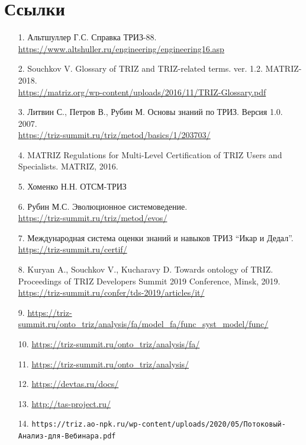 \documentclass[11pt,a4paper]{article}
\begin{document}
\section{Ссылки}
\begin{itemize}[leftmargin=18pt]
\item[1.] Альтшуллер Г.С. Справка ТРИЗ-88.\\
  \url{https://www.altshuller.ru/engineering/engineering16.asp}
\item[2.] Souchkov V. Glossary of TRIZ and TRIZ-related terms.  ver. 1.2.
  MATRIZ-2018.\\
  \url{https://matriz.org/wp-content/uploads/2016/11/TRIZ-Glossary.pdf}
\item[3.] Литвин С., Петров В., Рубин М. Основы знаний по ТРИЗ. Версия
  1.0. 2007.\\ \url{https://triz-summit.ru/triz/metod/basics/1/203703/}
\item[4.] MATRIZ Regulations for Multi-Level Certification of TRIZ Users and
  Specialists.  MATRIZ, 2016.
\item[5.] Хоменко Н.Н. ОТСМ-ТРИЗ
\item[6.] Рубин М.С. Эволюционное системоведение.\\
  \url{https://triz-summit.ru/triz/metod/evos/}
\item[7.] Международная система оценки знаний и навыков ТРИЗ “Икар и
  Дедал”.\\ \url{https://triz-summit.ru/certif/}
\item[8.] Kuryan A., Souchkov V., Kucharavy D. Towards ontology of TRIZ.
  Proceedings of TRIZ Developers Summit 2019 Conference, Minsk, 2019.\\
  \url{https://triz-summit.ru/confer/tds-2019/articles/it/}
\item[9.]
  \url{https://triz-summit.ru/onto_triz/analysis/fa/model_fa/func_syst_model/func/} 
\item[10.] \url{https://triz-summit.ru/onto_triz/analysis/fa/}
\item[11.] \url{https://triz-summit.ru/onto_triz/analysis/}
\item[12.] \url{https://devtas.ru/docs/}
\item[13.] \url{http://tas-project.ru/}
\item[14.] \texttt{https://triz.ao-npk.ru/wp-content/uploads/2020/05/Потоковый-Анализ-для-Вебинара.pdf}
\end{itemize}
\end{document}
